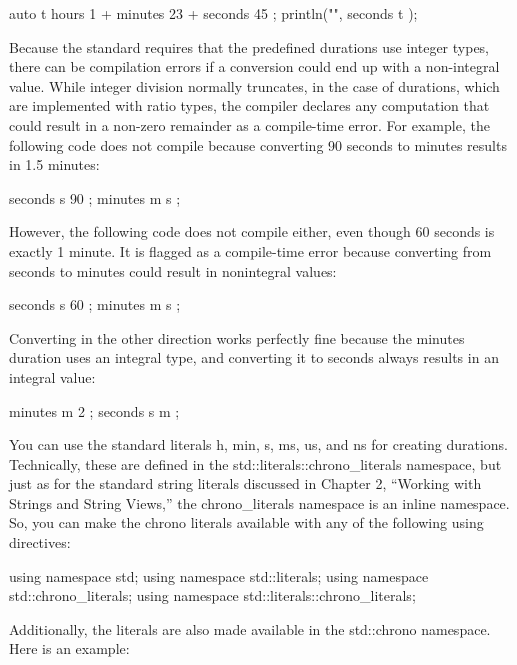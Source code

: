 \begin{cpp}
auto t { hours { 1 } + minutes { 23 } + seconds { 45 } };
println("{}", seconds { t });
\end{cpp}

Because the standard requires that the predefined durations use integer types, there can be compilation errors if a conversion could end up with a non-integral value. While integer division normally truncates, in the case of durations, which are implemented with ratio types, the compiler declares any computation that could result in a non-zero remainder as a compile-time error. For example, the following code does not compile because converting 90 seconds to minutes results in 1.5 minutes:

\begin{cpp}
seconds s { 90 };
minutes m { s };
\end{cpp}

However, the following code does not compile either, even though 60 seconds is exactly 1 minute. It is flagged as a compile-time error because converting from seconds to minutes could result in nonintegral values:

\begin{cpp}
seconds s { 60 };
minutes m { s };
\end{cpp}

Converting in the other direction works perfectly fine because the minutes duration uses an integral type, and converting it to seconds always results in an integral value:

\begin{cpp}
minutes m { 2 };
seconds s { m };
\end{cpp}


You can use the standard literals h, min, s, ms, us, and ns for creating durations. Technically, these are defined in the std::literals::chrono\_literals namespace, but just as for the standard string literals discussed in Chapter 2, “Working with Strings and String Views,” the chrono\_literals namespace is an inline namespace. So, you can make the chrono literals available with any of the following using directives:

\begin{cpp}
using namespace std;
using namespace std::literals;
using namespace std::chrono_literals;
using namespace std::literals::chrono_literals;
\end{cpp}

Additionally, the literals are also made available in the std::chrono namespace. Here is an example:

